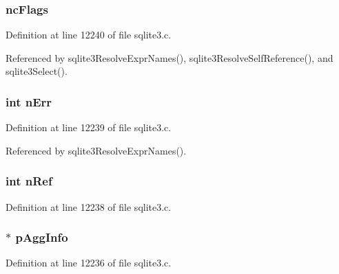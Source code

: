 \subsubsection[{nc\+Flags}]{ nc\+Flags}\label{struct_name_context_a2d901af4a5a0d74082ffb9652c4a0907}


Definition at line 12240 of file sqlite3.\+c.



Referenced by sqlite3\+Resolve\+Expr\+Names(), sqlite3\+Resolve\+Self\+Reference(), and sqlite3\+Select().

\hypertarget{struct_name_context_a60ebed73c4dbe105fdc4be21a01fd09c}{}
\subsubsection[{n\+Err}]{\setlength{\rightskip}{0pt plus 5cm}int n\+Err}\label{struct_name_context_a60ebed73c4dbe105fdc4be21a01fd09c}


Definition at line 12239 of file sqlite3.\+c.



Referenced by sqlite3\+Resolve\+Expr\+Names().

\hypertarget{struct_name_context_a3c459f9ae278c22b72583c55ca01acb7}{}
\subsubsection[{n\+Ref}]{\setlength{\rightskip}{0pt plus 5cm}int n\+Ref}\label{struct_name_context_a3c459f9ae278c22b72583c55ca01acb7}


Definition at line 12238 of file sqlite3.\+c.

\hypertarget{struct_name_context_a8d44bec2b506e6b367f1de588dbcae27}{}
\subsubsection[{p\+Agg\+Info}]{$\ast$ p\+Agg\+Info}\label{struct_name_context_a8d44bec2b506e6b367f1de588dbcae27}


Definition at line 12236 of file sqlite3.\+c.



